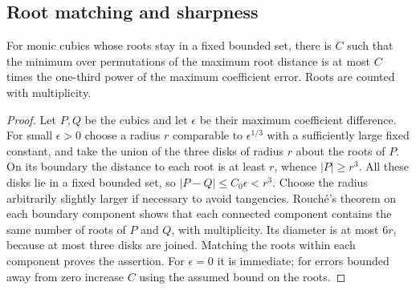 \subsection{Root matching and sharpness}
\begin{lemma}\label{lem:v5-roots}
For monic cubics whose roots stay in a fixed bounded set, there is $C$
such that the minimum over permutations of the maximum root distance is
at most $C$ times the one-third power of the maximum coefficient error.
Roots are counted with multiplicity.
\end{lemma}
\begin{proof}
Let $P,Q$ be the cubics and let $\epsilon$ be their maximum coefficient
difference. For small $\epsilon>0$ choose a radius
$r$ comparable to $\epsilon^{1/3}$ with a sufficiently large fixed
constant, and take the union of the three disks of radius $r$ about
the roots of $P$. On its boundary the distance to each root is at least
$r$, whence $|P|\ge r^3$. All these disks lie in a fixed bounded set,
so $|P-Q|\le C_0\epsilon<r^3$. Choose the radius arbitrarily slightly
larger if necessary to avoid tangencies. Rouch\'e's theorem on each
boundary component shows that each connected component contains the
same number of roots of $P$ and $Q$, with multiplicity. Its diameter
is at most $6r$, because at most three disks are joined. Matching the
roots within each component proves the assertion. For $\epsilon=0$
it is immediate; for errors bounded away from zero increase $C$ using
the assumed bound on the roots.
\end{proof}

